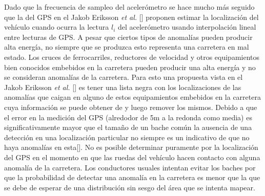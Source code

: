 Dado que la frecuencia de sampleo del acelerómetro se hace mucho más seguido que la del GPS en el Jakob Eriksson {\it et al.} [] proponen estimar la 
localización del vehículo cuando ocurra la lectura $l_i$ del acelerómetro usando interpolación lineal entre lecturas de GPS.
A pesar que ciertos tipos de anomalías pueden producir alta energía, no siempre que se produzca esto representa una carretera en mal estado. Los cruces 
de ferrocarriles, reductores de velocidad y otros equipamientos bien conocidos embebidos en la carretera pueden producir una alta energía y no 
se consideran anomalías de la carretera. Para esto una propuesta vista en el Jakob Eriksson {\it et al.} [] es tener una lista negra con los localizaciones 
de las anomalías que caigan en alguno de estos equipamientos embebidos en la carretera cuya información se puede obtener de  y luego remover los mismos. 
Debido a que el error en la medición del GPS (alredodor de 5m a la redonda como media) es significativamente mayor que el tamaño de un bache común la ausencia 
de una detección en una localización particular no siempre es un indicativo de que no haya anomalías en esta[]. No es posible determinar puramente 
por la localización del GPS en el momento en que las ruedas del vehículo hacen contacto con alguna anomalía de la carretera.  Los conductores usuales 
intentan evitar los baches por que la probabilidad de detectar una anomalía en la carretera es menor que la que se debe de esperar de una distribución  sin 
sesgo del área que se intenta mapear.
